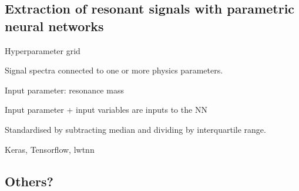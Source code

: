 \subsection{Extraction of resonant signals with parametric neural networks}
\label{sec:mva_pnn}


\begin{table}[htbp]
  \centering
  
  \caption{Hyperparameter grid}
  \label{tab:hyperparameter_grid_pnn}
\end{table}


Signal spectra connected to one or more physics parameters.

Input parameter: resonance mass \mX

Input parameter + input variables are inputs to the NN

Standardised by subtracting median and dividing by interquartile range.

Keras, Tensorflow, lwtnn






\subsection{Others?}



